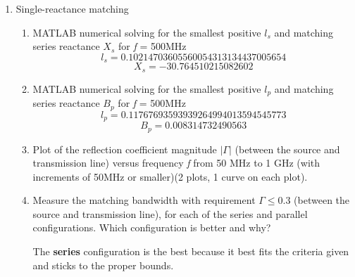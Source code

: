 \documentclass{article}
\begin{document}
\begin{enumerate}
    \item Single-reactance matching
    \begin{enumerate}
        \item MATLAB numerical solving for the smallest positive $l_s$ and matching series reactance $X_s$ for \textit{f} = 500MHz
        \begin{equation}
            l_s = 0.10214703605560054313134437005654
        \end{equation}
        \begin{equation}
            X_s = -30.764510215082602
        \end{equation}
        \item MATLAB numerical solving for the smallest positive $l_p$ and matching series reactance $B_p$ for \textit{f} = 500MHz
        \begin{equation}
            l_p = 0.11767693593939264994013594545773
        \end{equation}
        \begin{equation}
            B_p = 0.008314732490563
        \end{equation}
        \item Plot of the reflection coefficient magnitude $|\Gamma|$ (between the source and transmission line) versus frequency \textit{f} from 50 MHz to 1 GHz (with increments of 50MHz or smaller)(2 plots, 1 curve on each plot).
        \begin{center}
        \end{center}
        \item Measure the matching bandwidth with requirement $\Gamma \leq 0.3$ (between the source and transmission line), for each of the series and parallel configurations. Which configuration is better and why? 
        \begin{center}
            The \textbf{series} configuration is the best because it best fits the criteria given and sticks to the proper bounds.
        \end{center}
    \end{enumerate}
\end{enumerate}
\end{document}
